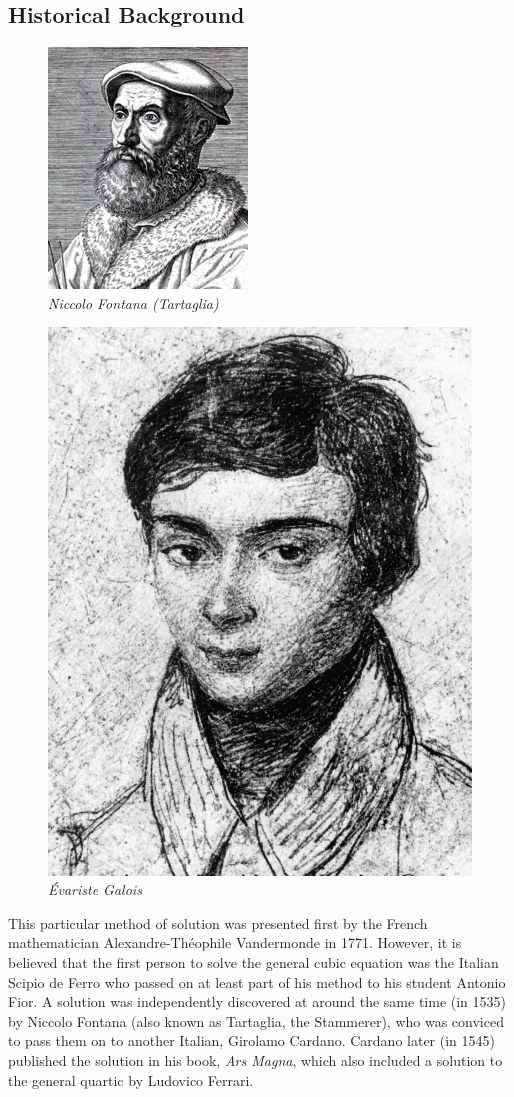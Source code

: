 \documentclass[a4paper,10pt,titlepage]{article}
\theoremstyle{definition}
\begin{document}
\subsection*{Historical Background}
\begin{figure}[h]
  \begin{minipage}{0.5\textwidth}
  \begin{center}
    \includegraphics[width=0.4\linewidth]{tartaglia}\\
    \small{\textit{Niccolo Fontana (Tartaglia)}}
  \end{center}
  \end{minipage}
  \begin{minipage}{0.5\textwidth}
  \begin{center}
    \includegraphics[width=0.4\linewidth]{galois}\\
    \small{\textit{\'Evariste Galois}}
  \end{center}
  \end{minipage}
\end{figure}

This particular method of solution was presented first by the French mathematician Alexandre-Th\'eophile Vandermonde
in 1771. However, it is believed that the first person to solve the general cubic equation was the Italian
Scipio de Ferro who passed on at least part of his method to his student Antonio Fior. A solution
was independently discovered at around the same time (in 1535) by Niccolo Fontana (also known as Tartaglia,
the Stammerer), who was conviced to pass them on to another Italian, Girolamo Cardano. Cardano later (in 1545)
published the solution in his book, \emph{Ars Magna}, which also included a solution to the general quartic
by Ludovico Ferrari.
\end{document}
